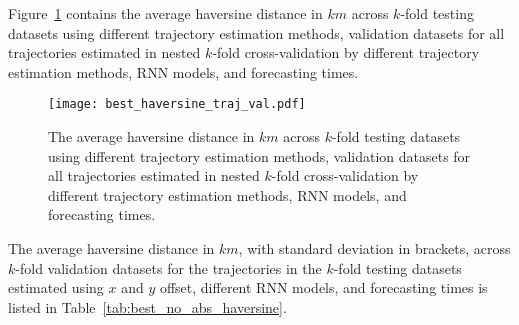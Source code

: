 Figure~\ref{fig:best_haversine_traj_val} contains the average haversine distance in $km$ across $k$-fold testing datasets using different trajectory estimation methods, validation datasets for all trajectories estimated in nested $k$-fold cross-validation by different trajectory estimation methods, RNN models, and forecasting times.

\begin{figure}[!ht]
	\centering
	\texttt{[image: best\_haversine\_traj\_val.pdf]}
	\caption{The average haversine distance in $km$ across $k$-fold testing datasets using different trajectory estimation methods, validation datasets for all trajectories estimated in nested $k$-fold cross-validation by different trajectory estimation methods, RNN models, and forecasting times.}
	\label{fig:best_haversine_traj_val}
\end{figure}

The average haversine distance in $km$, with standard deviation in brackets, across $k$-fold validation datasets for the trajectories in the $k$-fold testing datasets estimated using $x$ and $y$ offset, different RNN models, and forecasting times is listed in Table~\ref{tab:best_no_abs_haversine}.

\begin{table}[!ht]
	\centering
	\caption{The average haversine distance in $km$, with standard deviation in brackets, across $k$-fold validation datasets for the trajectories in the $k$-fold testing datasets estimated using $x$ and $y$ offset, different RNN models, and forecasting times.}
	\label{tab:best_no_abs_haversine}
\end{table}

